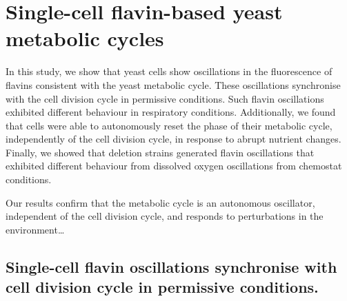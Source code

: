 
\chapter{Single-cell flavin-based yeast metabolic cycles}
\label{ch:biology}


In this study, we show that yeast cells show oscillations in the fluorescence of flavins consistent with the yeast metabolic cycle.  These oscillations synchronise with the cell division cycle in permissive conditions.  Such flavin oscillations exhibited different behaviour in respiratory conditions.  Additionally, we found that cells were able to autonomously reset the phase of their metabolic cycle, independently of the cell division cycle, in response to abrupt nutrient changes.  Finally, we showed that deletion strains generated flavin oscillations that exhibited different behaviour from dissolved oxygen oscillations from chemostat conditions.

Our results confirm that the metabolic cycle is an autonomous oscillator, independent of the cell division cycle, and responds to perturbations in the environment\ldots{}

\section{Single-cell flavin oscillations synchronise with cell division cycle in permissive conditions.}
\label{sec:biology-sync}

